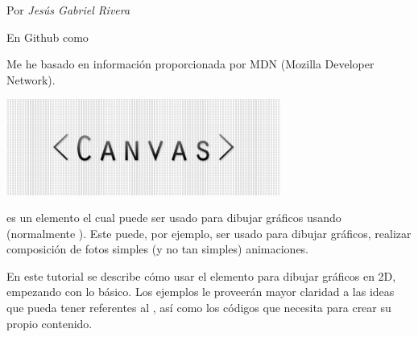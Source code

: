 
\graphicspath{{./assets/}}





Por \textit{Jesús Gabriel Rivera}

En \faGithub \hspace{0.1cm} Github como 

Me he basado en información proporcionada por MDN (Mozilla Developer Network).

\hrulefill %
\vspace{0.5cm} %

\begin{center}
	\huge\textbf{}
	\vspace{0.5cm} %

	\includegraphics[width=9cm]{logo-canvas} %
	\vspace{0.5cm} %
\end{center}

 es un elemento  el cual puede ser usado para dibujar gráficos usando  (normalmente ). Este puede, por ejemplo, ser usado para dibujar gráficos, realizar composición de fotos simples (y no tan simples) animaciones.

En este tutorial se describe cómo usar el elemento  para dibujar gráficos en 2D, empezando con lo básico. Los ejemplos le proveerán mayor claridad a las ideas que pueda tener referentes al , así como los códigos que necesita para crear su propio contenido.



